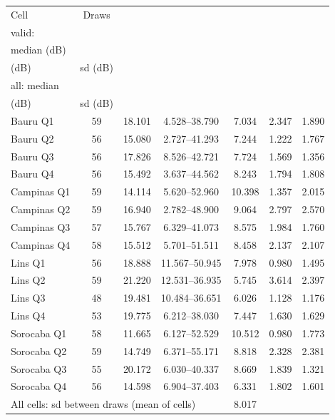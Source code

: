 \begin{tabular}{lcccccc}
\toprule
Cell & Draws & \celula{Constant, \\ \relax valid: \\ \relax median (dB)} & \celula{min--max \\ \relax (dB)} & sd (dB) & \celula{Constant, \\ \relax all: median \\ \relax (dB)} & sd (dB) \\
\midrule
Bauru Q1 & 59 & 18.101 & 4.528--38.790 & 7.034 & 2.347 & 1.890 \\
Bauru Q2 & 56 & 15.080 & 2.727--41.293 & 7.244 & 1.222 & 1.767 \\
Bauru Q3 & 56 & 17.826 & 8.526--42.721 & 7.724 & 1.569 & 1.356 \\
Bauru Q4 & 56 & 15.492 & 3.637--44.562 & 8.243 & 1.794 & 1.808 \\
Campinas Q1 & 59 & 14.114 & 5.620--52.960 & 10.398 & 1.357 & 2.015 \\
Campinas Q2 & 59 & 16.940 & 2.782--48.900 & 9.064 & 2.797 & 2.570 \\
Campinas Q3 & 57 & 15.767 & 6.329--41.073 & 8.575 & 1.984 & 1.760 \\
Campinas Q4 & 58 & 15.512 & 5.701--51.511 & 8.458 & 2.137 & 2.107 \\
Lins Q1 & 56 & 18.888 & 11.567--50.945 & 7.978 & 0.980 & 1.495 \\
Lins Q2 & 59 & 21.220 & 12.531--36.935 & 5.745 & 3.614 & 2.397 \\
Lins Q3 & 48 & 19.481 & 10.484--36.651 & 6.026 & 1.128 & 1.176 \\
Lins Q4 & 53 & 19.775 & 6.212--38.030 & 7.447 & 1.630 & 1.629 \\
Sorocaba Q1 & 58 & 11.665 & 6.127--52.529 & 10.512 & 0.980 & 1.773 \\
Sorocaba Q2 & 59 & 14.749 & 6.371--55.171 & 8.818 & 2.328 & 2.381 \\
Sorocaba Q3 & 55 & 20.172 & 6.030--40.337 & 8.669 & 1.839 & 1.321 \\
Sorocaba Q4 & 56 & 14.598 & 6.904--37.403 & 6.331 & 1.802 & 1.601 \\
\midrule
\multicolumn{4}{p{0.5\linewidth}}{\raggedright All cells: sd between draws (mean of cells)} & 8.017 & & \\

\end{tabular}
